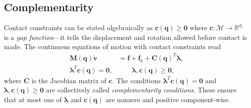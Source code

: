 \documentclass[preprint,12pt]{elsarticle}
\let\vec\bm
\let\mat\mathbf
\numberwithin{equation}{section}
\def\conf{q}
\def\tg{\text{g}}
\newcommand{\complementarityalign}[2]{{#1}^T{#2}=\vec{0}, &\qquad #1, #2 \geq \vec{0}}
\begin{document}
\subsection{Complementarity}
\label{sec:complementarity}
Contact constraints can be stated algebraically as $\vec{c}(\vec{\conf}) \geq \vec{0}$ where $\vec{c}: \mathcal{M} \rightarrow \mathbb{R}^{d_{\text{c}}}$ is a \emph{gap function}---it tells the displacement and rotation allowed before contact is made.
The continuous equations of motion with contact constraints read
\begin{equation}
    \begin{aligned}
        \mat{M} (\vec{\conf}) \dot{\vec{v}} & = \vec{f} + \vec{f}_\tg + \mat{C}(\vec{\conf})^T \vec{\lambda}, \\
        \complementarityalign{\vec{\lambda}}{\vec{c}(\vec{\conf})},
    \end{aligned}
\end{equation}
where $\mat{C}$ is the Jacobian matrix of $\vec{c}$.
The conditions $\vec{\lambda}^T\vec{c}(\vec{\conf}) = \vec{0}$ and $\vec{\lambda}, \vec{c}(\vec{\conf}) \geq \vec{0}$ are collectively called \emph{complementarity conditions}.
These ensure that at most one of $\vec{\lambda}$ and $\vec{c}(\vec{\conf})$ are nonzero and positive component-wise.
\end{document}
